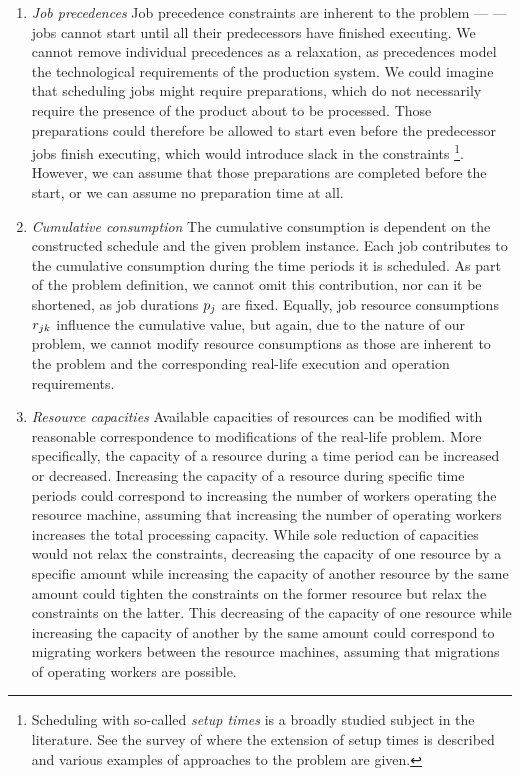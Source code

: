 \begin{enumerate}[label=(\roman*)]
    \item \emph{Job precedences}
    Job precedence constraints are inherent to the problem ---
    --- jobs cannot start until all their predecessors have finished executing.
    We cannot remove individual precedences as a relaxation,
    as precedences model the technological requirements of the production system.
    We could imagine that scheduling jobs might require preparations,
    which do not necessarily require the presence of the product about to be processed.
    Those preparations could therefore be allowed to start even before the predecessor jobs finish executing,
    which would introduce slack in the constraints%
    \footnote{
    Scheduling with so-called \emph{setup times} is a broadly studied subject in the literature.
    See the survey of \citet{Hartmann2010} where the extension of setup times is described
    and various examples of approaches to the problem are given.
    }.
    However, we can assume that those preparations are completed before the start,
    or we can assume no preparation time at all.

    \item \emph{Cumulative consumption}
    The cumulative consumption is dependent on the constructed schedule and the given problem instance.
    Each job contributes to the cumulative consumption during the time periods it is scheduled.
    As part of the problem definition, we cannot omit this contribution,
    nor can it be shortened, as job durations $p_{j}$ are fixed.
    Equally, job resource consumptions $r_{j k}$ influence the cumulative value,
    but again, due to the nature of our problem,
    we cannot modify resource consumptions as those are inherent to the problem
    and the corresponding real-life execution and operation requirements.

    \item \emph{Resource capacities}
    Available capacities of resources can be modified with reasonable correspondence
    to modifications of the real-life problem.
    More specifically, the capacity of a resource during a time period can be increased or decreased.
    Increasing the capacity of a resource during specific time periods could correspond to increasing
    the number of workers operating the resource machine,
    assuming that increasing the number of operating workers increases the total processing capacity.
    While sole reduction of capacities would not relax the constraints,
    decreasing the capacity of one resource by a specific amount
    while increasing the capacity of another resource
    by the same amount could tighten the constraints on the former resource
    but relax the constraints on the latter.
    This decreasing of the capacity of one resource
    while increasing the capacity of another by the same amount
    could correspond to migrating workers between the resource machines,
    assuming that migrations of operating workers are possible.
\end{enumerate}

